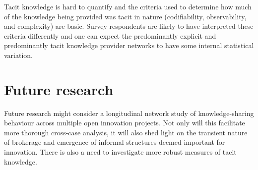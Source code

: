 Tacit knowledge is hard to quantify and the criteria used to determine how much of the knowledge being provided was tacit in nature (codifiability, observability, and complexity) are basic. Survey respondents are likely to have interpreted these criteria differently and one can expect the predominantly explicit and predominantly tacit knowledge provider networks to have some internal statistical variation. \medskip

\section{Future research}

Future research might consider a longitudinal network study of knowledge-sharing behaviour across multiple open innovation projects. Not only will this facilitate more thorough cross-case analysis, it will also shed light on the transient nature of brokerage and emergence of informal structures deemed important for innovation. There is also a need to investigate more robust measures of tacit knowledge. \medskip
